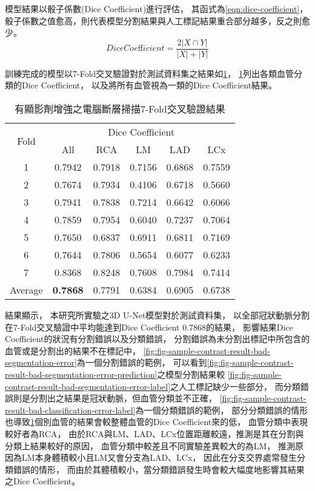\documentclass[class=NCU_thesis, crop=false]{standalone}
\begin{document}
模型結果以骰子係數(Dice Coefficient)進行評估，
其函式為\cref{eqn:dice-coefficient}，
骰子係數之值愈高，則代表模型分割結果與人工標記結果重合部分越多，反之則愈少。
\begin{equation}
\label{eqn:dice-coefficient}
Dice Coeﬀicient = \frac{2|X\cap Y|}{|X|+|Y|} 
\end{equation}

訓練完成的模型以7-Fold交叉驗證對於測試資料集之結果如\cref{table:table-contrast-7-fold-result}，
\cref{table:table-contrast-7-fold-result}列出各類血管分類的Dice Coeﬀicient，
以及將所有血管視為一類的Dice Coeﬀicient結果。

\begin{table}[h]
    \centering
    \caption{有顯影劑增強之電腦斷層掃描7-Fold交叉驗證結果}
    \label{table:table-contrast-7-fold-result}
    \begin{tabular}{cccccc}
    \hline
    \multirow{2}{*}{Fold} & \multicolumn{5}{c}{Dice Coefficient} \\
    \cline{2-6}
    & All & RCA & LM & LAD & LCx \\
    \hline
    1 & 0.7942 & 0.7918 & 0.7156 & 0.6868 & 0.7559 \\
    2 & 0.7674 & 0.7934 & 0.4106 & 0.6718 & 0.5660 \\
    3 & 0.7941 & 0.7838 & 0.7214 & 0.6642 & 0.6066 \\
    4 & 0.7859 & 0.7954 & 0.6040 & 0.7237 & 0.7064 \\
    5 & 0.7650 & 0.6837 & 0.6911 & 0.6811 & 0.7169 \\
    6 & 0.7644 & 0.7806 & 0.5654 & 0.6077 & 0.6233 \\
    7 & 0.8368 & 0.8248 & 0.7608 & 0.7984 & 0.7414 \\
    \hline
    Average & \textbf{0.7868} & 0.7791 & 0.6384 & 0.6905 & 0.6738 \\
    \hline
    \end{tabular}
\end{table}

結果顯示，
本研究所實驗之3D U-Net模型對於測試資料集，
以全部冠狀動脈分割在7-Fold交叉驗證中平均能達到Dice Coefficient 0.7868的結果，
影響結果Dice Coefficient的狀況有分割錯誤以及分類錯誤，
分割錯誤為未分割出標記中所包含的血管或是分割出的結果不在標記中，
\cref{fig:fig-sample-contrast-result-bad-segmentation-error}為一個分割錯誤的範例，
可以看到\cref{fig:fig-sample-contrast-result-bad-segmentation-error-prediction}之模型分割結果較
\cref{fig:fig-sample-contrast-result-bad-segmentation-error-label}之人工標記缺少一些部分，
而分類錯誤則是分割出之結果是冠狀動脈，但血管分類並不正確，
\cref{fig:fig-sample-contrast-result-bad-classification-error-label}為一個分類錯誤的範例，
部分分類錯誤的情形也導致\cref{table:table-contrast-7-fold-result}個別血管的結果會較整體血管的Dice Coeﬀicient來的低，
血管分類中表現較好者為RCA，
由於RCA與LM、LAD、LCx位置距離較遠，推測是其在分割與分類上結果較好的原因，
血管分類中較差且不同實驗差異較大的為LM，
推測原因為LM本身體積較小且LM又會分支為LAD、LCx，
因此在分支交界處常發生分類錯誤的情形，
而由於其體積較小，當分類錯誤發生時會較大幅度地影響其結果之Dice Coeﬀicient。
\end{document}
